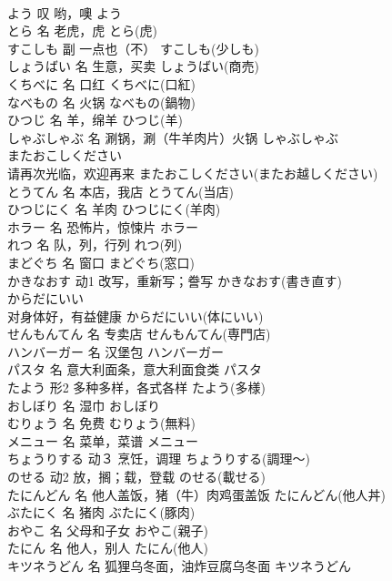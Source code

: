 \documentclass[8pt]{extreport}
\begin{document}
\begin{CJK}{UTF8}{min}
\\	よう	叹	哟，噢	よう	
\\	とら	名	老虎，虎	とら(虎)	
\\	すこしも	副	一点也（不）	すこしも(少しも)	
\\	しょうばい	名	生意，买卖	しょうばい(商売)	
\\	くちべに	名	口红	くちべに(口紅)	
\\	なべもの	名	火锅	なべもの(鍋物)	
\\	ひつじ	名	羊，绵羊	ひつじ(羊)	
\\	しゃぶしゃぶ	名	涮锅，涮（牛羊肉片）火锅	しゃぶしゃぶ	
\\	またおこしください	
\\	请再次光临，欢迎再来	またおこしください(またお越しください)	
\\	とうてん	名	本店，我店	とうてん(当店)	
\\	ひつじにく	名	羊肉	ひつじにく(羊肉)	
\\	ホラー	名	恐怖片，惊悚片	ホラー	
\\	れつ	名	队，列，行列	れつ(列)	
\\	まどぐち	名	窗口	まどぐち(窓口)	
\\	かきなおす	动1	改写，重新写；誊写	かきなおす(書き直す)	
\\	からだにいい	
\\	对身体好，有益健康	からだにいい(体にいい)	
\\	せんもんてん	名	专卖店	せんもんてん(専門店)	
\\	ハンバーガー	名	汉堡包	ハンバーガー	
\\	パスタ	名	意大利面条，意大利面食类	パスタ	
\\	たよう	形2	多种多样，各式各样	たよう(多様)	
\\	おしぼり	名	湿巾	おしぼり	
\\	むりょう	名	免费	むりょう(無料)	
\\	メニュー	名	菜单，菜谱	メニュー	
\\	ちょうりする	动３	烹饪，调理	ちょうりする(調理～)	
\\	のせる	动2	放，搁；载，登载	のせる(載せる)	
\\	たにんどん	名	他人盖饭，猪（牛）肉鸡蛋盖饭	たにんどん(他人丼)	
\\	ぶたにく	名	猪肉	ぶたにく(豚肉)	
\\	おやこ	名	父母和子女	おやこ(親子)	
\\	たにん	名	他人，别人	たにん(他人)	
\\	キツネうどん	名	狐狸乌冬面，油炸豆腐乌冬面	キツネうどん	

\end{CJK}
\end{document}
